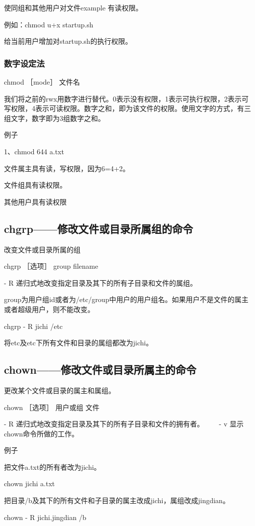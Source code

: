 使同组和其他用户对文件example 有读权限。

例如：chmod u+x startup.sh

给当前用户增加对startup.sh的执行权限。


\subsubsection{数字设定法}
chmod ［mode］ 文件名

我们将之前的rwx用数字进行替代。0表示没有权限，1表示可执行权限，2表示可写权限，4表示可读权限。数字之和，即为该文件的权限。使用文字的方式，有三组文字，数字即为3组数字之和。

例子

1、chmod 644 a.txt

文件属主具有读，写权限，因为6=4+2。

文件组具有读权限。

其他用户具有读权限


\subsection{chgrp——修改文件或目录所属组的命令}
改变文件或目录所属的组

chgrp ［选项］ group filename

- R 递归式地改变指定目录及其下的所有子目录和文件的属组。

group为用户组id或者为/etc/group中用户的用户组名。如果用户不是文件的属主或者超级用户，则不能改变。

chgrp - R jichi /etc

将etc及etc下所有文件和目录的属组都改为jichi。


\subsection{chown——修改文件或目录所属主的命令}
更改某个文件或目录的属主和属组。

chown ［选项］ 用户或组 文件　　

- R 递归式地改变指定目录及其下的所有子目录和文件的拥有者。　
　
- v 显示chown命令所做的工作。　　

例子

把文件a.txt的所有者改为jichi。

chown jichi a.txt　　

把目录/b及其下的所有文件和子目录的属主改成jichi，属组改成jingdian。

chown - R jichi.jingdian /b




